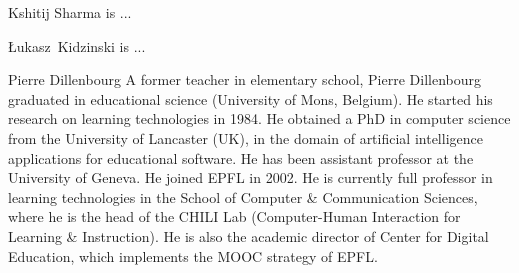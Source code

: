 \documentclass[10pt,journal,compsoc]{IEEEtran}
\begin{document}
\begin{IEEEbiography}{Kshitij Sharma}
 is ...
\end{IEEEbiography}

\begin{IEEEbiography}{{\L}ukasz~Kidzinski}
 is ...
\end{IEEEbiography}


\begin{IEEEbiography}{Pierre Dillenbourg} A former teacher in elementary school, Pierre Dillenbourg graduated in educational science (University of Mons, Belgium). He started his research on learning technologies in 1984. He obtained a PhD in computer science from the University of Lancaster (UK), in the domain of artificial intelligence applications for educational software. He has been assistant professor at the University of Geneva. He joined EPFL in 2002. He is currently full professor in learning technologies in the School of Computer \& Communication Sciences, where he is the head of the CHILI Lab (Computer-Human Interaction for Learning \& Instruction). He is also the academic director of Center for Digital Education, which implements the MOOC strategy of EPFL.
\end{IEEEbiography}






\end{document}
